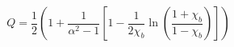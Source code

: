 \begin{equation}
    Q = \frac{1}{2}\left(
        1 +  \frac{1}{\alpha^2 - 1}\left[1 - \frac{1}{2\chi_b} \ln\left(\frac{1 + \chi_b}{1 - \chi_b}\right)\right]
    \right)
    \label{eq:emt_q_prolate_spheroid}
\end{equation}
